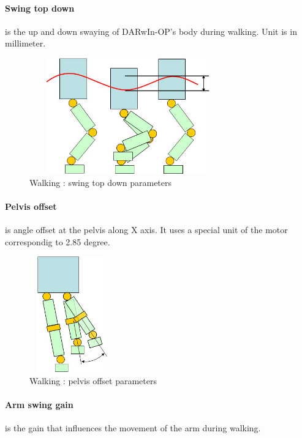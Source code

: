 \documentclass[a4paper, 12pt]{article}  		%
\begin{document}
\paragraph*{Swing top down}
is the up and down swaying of DARwIn-OP's body during walking. Unit is in millimeter.
\begin{figure}[H]
\begin{center}
\includegraphics[height=5cm, width=8.5cm]{swing_top_down.jpg}
\caption{Walking : swing top down parameters}
\label{swing_top_down}
\end{center}
\end{figure}

\paragraph*{Pelvis offset}
is angle offset at the pelvis along X axis. It uses a special unit of the motor correspondig to 2.85 degree.
\begin{figure}[H]
\begin{center}
\includegraphics[height=5cm, width=3.7cm]{pelvis_offset.jpg}
\caption{Walking : pelvis offset parameters}
\label{pelvis_offset}
\end{center}
\end{figure}

\paragraph*{Arm swing gain}
is the gain that influences the movement of the arm during walking.
\end{document}
